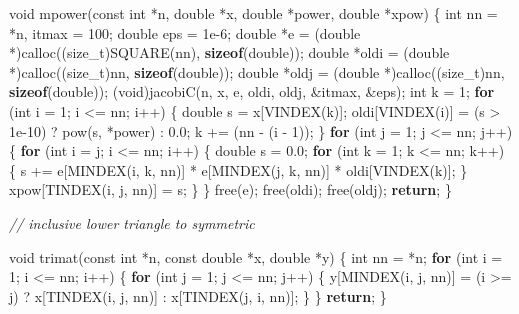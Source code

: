 \documentclass[12pt,]{article}
\newenvironment{Shaded}{\begin{snugshade}}{\end{snugshade}}
\newcommand{\KeywordTok}[1]{\textcolor[rgb]{0.13,0.29,0.53}{\textbf{#1}}}
\newcommand{\DataTypeTok}[1]{\textcolor[rgb]{0.13,0.29,0.53}{#1}}
\newcommand{\DecValTok}[1]{\textcolor[rgb]{0.00,0.00,0.81}{#1}}
\newcommand{\FloatTok}[1]{\textcolor[rgb]{0.00,0.00,0.81}{#1}}
\newcommand{\CommentTok}[1]{\textcolor[rgb]{0.56,0.35,0.01}{\textit{#1}}}
\newcommand{\ControlFlowTok}[1]{\textcolor[rgb]{0.13,0.29,0.53}{\textbf{#1}}}
\newcommand{\NormalTok}[1]{#1}
\begin{document}
\begin{Shaded}
\begin{Highlighting}[]
{{{{{\DataTypeTok{void}\NormalTok{ mpower(}\DataTypeTok{const} \DataTypeTok{int}\NormalTok{ *n, }\DataTypeTok{double}\NormalTok{ *x, }\DataTypeTok{double}\NormalTok{ *power, }\DataTypeTok{double}\NormalTok{ *xpow) \{}
    \DataTypeTok{int}\NormalTok{ nn = *n, itmax = }\DecValTok{100}\NormalTok{;}
    \DataTypeTok{double}\NormalTok{ eps = }\FloatTok{1e-6}\NormalTok{;}
    \DataTypeTok{double}\NormalTok{ *e = (}\DataTypeTok{double}\NormalTok{ *)calloc((}\DataTypeTok{size_t}\NormalTok{)SQUARE(nn), }\KeywordTok{sizeof}\NormalTok{(}\DataTypeTok{double}\NormalTok{));}
    \DataTypeTok{double}\NormalTok{ *oldi = (}\DataTypeTok{double}\NormalTok{ *)calloc((}\DataTypeTok{size_t}\NormalTok{)nn, }\KeywordTok{sizeof}\NormalTok{(}\DataTypeTok{double}\NormalTok{));}
    \DataTypeTok{double}\NormalTok{ *oldj = (}\DataTypeTok{double}\NormalTok{ *)calloc((}\DataTypeTok{size_t}\NormalTok{)nn, }\KeywordTok{sizeof}\NormalTok{(}\DataTypeTok{double}\NormalTok{));}
\NormalTok{    (}\DataTypeTok{void}\NormalTok{)jacobiC(n, x, e, oldi, oldj, &itmax, &eps);}
    \DataTypeTok{int}\NormalTok{ k = }\DecValTok{1}\NormalTok{;}
    \ControlFlowTok{for}\NormalTok{ (}\DataTypeTok{int}\NormalTok{ i = }\DecValTok{1}\NormalTok{; i <= nn; i++) \{}
        \DataTypeTok{double}\NormalTok{ s = x[VINDEX(k)];}
\NormalTok{        oldi[VINDEX(i)] = (s > }\FloatTok{1e-10}\NormalTok{) ? pow(s, *power) : }\FloatTok{0.0}\NormalTok{;}
\NormalTok{        k += (nn - (i - }\DecValTok{1}\NormalTok{));}
\NormalTok{    \}}
    \ControlFlowTok{for}\NormalTok{ (}\DataTypeTok{int}\NormalTok{ j = }\DecValTok{1}\NormalTok{; j <= nn; j++) \{}
        \ControlFlowTok{for}\NormalTok{ (}\DataTypeTok{int}\NormalTok{ i = j; i <= nn; i++) \{}
            \DataTypeTok{double}\NormalTok{ s = }\FloatTok{0.0}\NormalTok{;}
            \ControlFlowTok{for}\NormalTok{ (}\DataTypeTok{int}\NormalTok{ k = }\DecValTok{1}\NormalTok{; k <= nn; k++) \{}
\NormalTok{                s +=}
\NormalTok{                    e[MINDEX(i, k, nn)] * e[MINDEX(j, k, nn)] * oldi[VINDEX(k)];}
\NormalTok{            \}}
\NormalTok{            xpow[TINDEX(i, j, nn)] = s;}
\NormalTok{        \}}
\NormalTok{    \}}
\NormalTok{    free(e);}
\NormalTok{    free(oldi);}
\NormalTok{    free(oldj);}
    \ControlFlowTok{return}\NormalTok{;}
\NormalTok{\}}

\CommentTok{// inclusive lower triangle to symmetric}

\DataTypeTok{void}\NormalTok{ trimat(}\DataTypeTok{const} \DataTypeTok{int}\NormalTok{ *n, }\DataTypeTok{const} \DataTypeTok{double}\NormalTok{ *x, }\DataTypeTok{double}\NormalTok{ *y) \{}
    \DataTypeTok{int}\NormalTok{ nn = *n;}
    \ControlFlowTok{for}\NormalTok{ (}\DataTypeTok{int}\NormalTok{ i = }\DecValTok{1}\NormalTok{; i <= nn; i++) \{}
        \ControlFlowTok{for}\NormalTok{ (}\DataTypeTok{int}\NormalTok{ j = }\DecValTok{1}\NormalTok{; j <= nn; j++) \{}
\NormalTok{            y[MINDEX(i, j, nn)] =}
\NormalTok{                (i >= j) ? x[TINDEX(i, j, nn)] : x[TINDEX(j, i, nn)];}
\NormalTok{        \}}
\NormalTok{    \}}
    \ControlFlowTok{return}\NormalTok{;}
\NormalTok{\}}

}}}}}
\end{Highlighting}
\end{Shaded}
\end{document}
